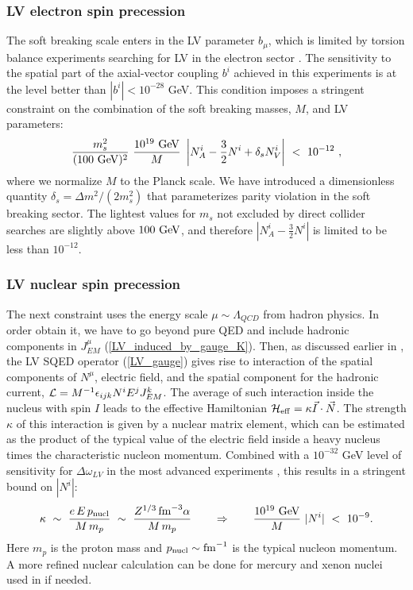 \documentclass[12pt]{revtex4}
\begin{document}
\subsubsection*{LV electron spin precession}


The soft  breaking scale enters in the LV parameter $b_\mu$, which is 
limited by torsion balance experiments searching for LV in the
electron sector \cite{Heckel:1999sy}. The sensitivity to the spatial
part of the axial-vector  
coupling $b^i$ achieved in this experiments is at the level better
than $|b^i| < 10^{-28}$ GeV. This condition imposes a stringent
constraint on the combination of the soft breaking masses, 
$M$, and LV parameters:
%
\begin{equation}
\frac{m_{s}^2}{(100~{\rm GeV})^2}~
\frac {10^{19}~{\rm GeV}}{M} ~ 
\left| N_A^i - \frac{3}{2} N^i + \delta_{s} N_V^i \right |
~<~10^{-12}~, 
\label{b_limit}
\end{equation}
%
where we normalize $M$ to the Planck scale. We have introduced a
dimensionless quantity  
$\delta_s = \Delta m^2/(2m_s^2)$ that parameterizes parity violation
in the soft breaking sector. The lightest values for $m_s$ not
excluded by direct collider searches are slightly above 
$100~{\rm GeV}$, and therefore $|N_A^i - \frac{3}{2} N^i |$ is limited
to be less than $10^{-12}$.  


\subsubsection*{LV nuclear spin precession}


The next constraint uses the energy scale $\mu \sim \Lambda_{QCD}$ from
hadron physics. In order obtain it, we have to go beyond pure QED and
include hadronic components in $J^\mu_{EM}$
(\ref{LV_induced_by_gauge_K}). Then, as discussed earlier in  
\cite{GrootNibbelink:2004za}, the LV SQED operator (\ref{LV_gauge})
gives rise to interaction of the spatial components of $N^\mu$,
electric field, and the spatial component  
for the hadronic current, ${\cal L} = M^{-1}\epsilon_{ijk} N^i E^j J_{EM}^k$.
The average of such interaction inside the nucleus with spin $I$ leads to 
the effective Hamiltonian 
$\mathcal{H}_{\rm eff}= \kappa \vec I\cdot \vec N$.
The strength $\kappa$ of this interaction is given by a nuclear matrix
element, which can be estimated as the product of the typical value of 
the electric field inside a heavy nucleus times the characteristic  
nucleon momentum. Combined with a $10^{-32}$ GeV level of sensitivity
for  $\Delta \omega_{LV}$ in the most advanced experiments
\cite{clock1,clock2}, this results in a stringent bound on $|N^i|$:
%
\begin{equation}
\kappa ~\sim~ \frac{e\, E \, p_{\rm nucl}}{M\, m_p} 
~\sim~ \frac{Z^{1/3}\, {\rm fm}^{-3}\alpha}{M \,m_p} 
\qquad \Rightarrow \qquad
\frac {10^{19}~{\rm GeV}}{M} ~ |N^i| ~<~ 10^{-9}.
\label{N_limit_nucl}
\end{equation}
%
Here $m_p$ is the proton mass and $p_{\rm nucl}\sim {\rm fm}^{-1}$ is
the typical nucleon momentum. A more refined nuclear calculation can
be done for mercury and xenon nuclei used in \cite{clock1,clock2} if needed.
\end{document}
